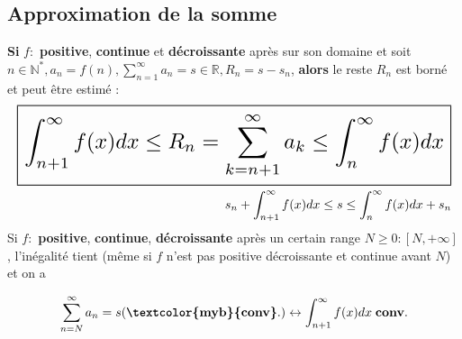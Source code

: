 \documentclass{report}
\begin{document}
\begin{multicols*}{3}
    \section{Approximation de la somme}
    \textbf{Si} $f:$ \textbf{positive}, \textbf{continue} et \textbf{décroissante} 
    après sur son domaine et soit $n \in \mathbb{N}^*, 
    a_n = f(n), \sum_{n=1}^{\infty }a_n = s \in \mathbb{R}, 
    R_n = s - s_n$, \textbf{alors} le reste $R_n$ est borné et peut être 
     estimé :
     \begin{align*}
        \resizebox{1\linewidth}{!}{$ 
        \boxed{
        \int_{n+1}^{\infty }f(x)dx \leq R_n = \sum_{k=n+1}^{\infty} a_k 
        \leq \int_{n}^{\infty }f(x)dx
        }
        $}
        \\ 
        s_n + \int_{n+1}^{\infty }f(x)dx \leq s  
        \leq \int_{n}^{\infty }f(x)dx + s_n
     \end{align*}
     Si $f:$ \textbf{positive}, \textbf{continue},  \textbf{décroissante} 
     après un certain range $N \geq 0 : [N, +\infty]$, l'inégalité tient 
     (même si $f$ n'est pas positive décroissante et continue avant $N$) 
     et on a 
    
     \begin{align*}
         \sum_{n=N}^{\infty} a_n = s (\textbf{\textcolor{myb}{conv}}.) \leftrightarrow    
         \int_{n+1}^{\infty }f(x)dx  \; \textbf{conv}.   
     \end{align*}               


    \begin{center}
    \end{center}


\end{multicols*}
\end{document}
